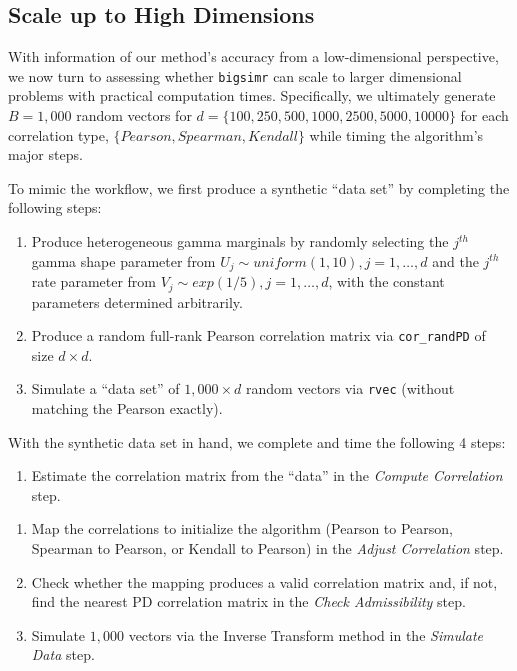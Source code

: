 \documentclass[
]{jss}
\providecommand{\tightlist}{%
  \setlength{\itemsep}{0pt}\setlength{\parskip}{0pt}}
\begin{document}
\hypertarget{scale-up-to-high-dimensions}{%
\subsection{Scale up to High Dimensions}\label{scale-up-to-high-dimensions}}

With information of our method's accuracy from a low-dimensional perspective, we now turn to assessing whether \texttt{bigsimr} can scale to larger dimensional problems with practical computation times. Specifically, we ultimately generate \(B=1,000\) random vectors for \(d=\{100, 250, 500, 1000, 2500, 5000, 10000\}\) for each correlation type, \(\{Pearson, Spearman, Kendall\}\) while timing the algorithm's major steps.

To mimic the workflow, we first produce a synthetic ``data set'' by completing the following steps:


\begin{enumerate}
\def\labelenumi{\arabic{enumi}.}
\tightlist
\item
  Produce heterogeneous gamma marginals by randomly selecting the \(j^{th}\) gamma shape parameter from \(U_j \sim uniform(1,10), j=1,\ldots,d\) and the \(j^{th}\) rate parameter from \(V_j \sim exp(1/5), j=1,\ldots,d\), with the constant parameters determined arbitrarily.
\item
  Produce a random full-rank Pearson correlation matrix via \texttt{cor\_randPD} of size \(d \times d\).
\item
  Simulate a ``data set'' of \(1,000 \times d\) random vectors via \texttt{rvec} (without matching the Pearson exactly).
\end{enumerate}

With the synthetic data set in hand, we complete and time the following 4 steps:


\begin{enumerate}
\def\labelenumi{\roman{enumi}.}
\tightlist
\item
  Estimate the correlation matrix from the ``data'' in the \emph{Compute Correlation} step.
\end{enumerate}

\begin{enumerate}
\def\labelenumi{\arabic{enumi}.}
\tightlist
\item
  Map the correlations to initialize the algorithm (Pearson to Pearson, Spearman to Pearson, or Kendall to Pearson) in the \emph{Adjust Correlation} step.
\item
  Check whether the mapping produces a valid correlation matrix and, if not, find the nearest PD correlation matrix in the \emph{Check Admissibility} step.
\item
  Simulate \(1,000\) vectors via the Inverse Transform method in the \emph{Simulate Data} step.
\end{enumerate}
\end{document}
